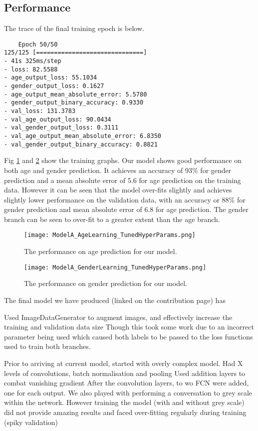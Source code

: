 \subsection{Performance}
The trace of the final training epoch is below.

\begin{verbatim}
    Epoch 50/50
125/125 [==============================] 
- 41s 325ms/step 
- loss: 82.5588 
- age_output_loss: 55.1034 
- gender_output_loss: 0.1627 
- age_output_mean_absolute_error: 5.5780 
- gender_output_binary_accuracy: 0.9330 
- val_loss: 131.3783 
- val_age_output_loss: 90.0434 
- val_gender_output_loss: 0.3111 
- val_age_output_mean_absolute_error: 6.8350 
- val_gender_output_binary_accuracy: 0.8821
\end{verbatim}

Fig \ref{fig:ModelAPerformanceAge} and \ref{fig:ModelAPerformanceGender}
show the training graphs. Our model shows good performance on both age and gender prediction. It achieves an accuracy
of 93\% for gender prediction and a mean absolute error of 5.6 for age prediction on the training data. 
However it can be seen that the model over-fits slightly and achieves slightly lower performance on the validation
data, with an accuracy or 88\% for gender prediction and mean absolute error of 6.8 for age prediction. The gender 
branch can be seen to over-fit to a greater extent than the age branch.

\begin{figure}
    \centering
    \texttt{[image: ModelA\_AgeLearning\_TunedHyperParams.png]}
    \caption{\label{fig:ModelAPerformanceAge} The performance on age prediction for our model.}
\end{figure}


\begin{figure}
    \centering
    \texttt{[image: ModelA\_GenderLearning\_TunedHyperParams.png]}
    \caption{\label{fig:ModelAPerformanceGender} The performance on gender prediction for our model.}
\end{figure}

The final model we have produced (linked on the contribution page) has 

Used ImageDataGenerator to augment images, and effectively increase the training and validation data size
Though this took some work due to an incorrect parameter being used which caused both labels to be passed to the loss functions used to train both branches.

Prior to arriving at current model, started with overly complex model.
Had X levels of convolutions, batch normalisation and pooling
Used addition layers to combat vanishing gradient
After the convolution layers, to wo FCN were added, one for each output.
We also played with performing a conversation to grey scale within the network.
However training the model (with and without grey scale) did not provide amazing results and faced over-fitting regularly during training (spiky validation)

